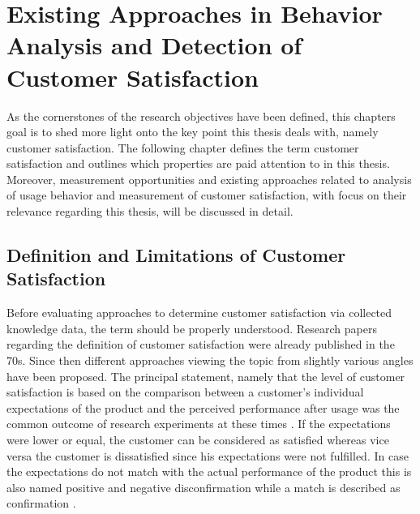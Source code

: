\chapter{Existing Approaches in Behavior Analysis and Detection of Customer Satisfaction}
\label{ch:backgroundResearch}
As the cornerstones of the research objectives have been defined, this chapters goal is to shed more light onto the key point this thesis deals with, namely customer satisfaction. The following chapter defines the term customer satisfaction and outlines which properties are paid attention to in this thesis. Moreover, measurement opportunities and existing approaches related to analysis of usage behavior and measurement of customer satisfaction, with focus on their relevance regarding this thesis, will be discussed in detail.

\section{Definition and Limitations of Customer Satisfaction}
\label{sec:custSatisfactionDefinition}
Before evaluating approaches to determine customer satisfaction via collected knowledge data, the term should be properly understood. Research papers regarding the definition of customer satisfaction were already published in the 70s. Since then different approaches viewing the topic from slightly various angles have been proposed. The principal statement, namely that the level of customer satisfaction is based on the comparison between a customer's individual expectations of the product and the perceived performance after usage was the common outcome of research experiments at these times \cite{oliver1977effect} \cite{anderson1973consumer}. If the expectations were lower or equal, the customer can be considered as satisfied whereas vice versa the customer is dissatisfied since his expectations were not fulfilled. In case the expectations do not match with the actual performance of the product this is also named positive and negative disconfirmation while a match is described as confirmation \cite{oliver1977effect} \cite{anderson1973consumer}.

